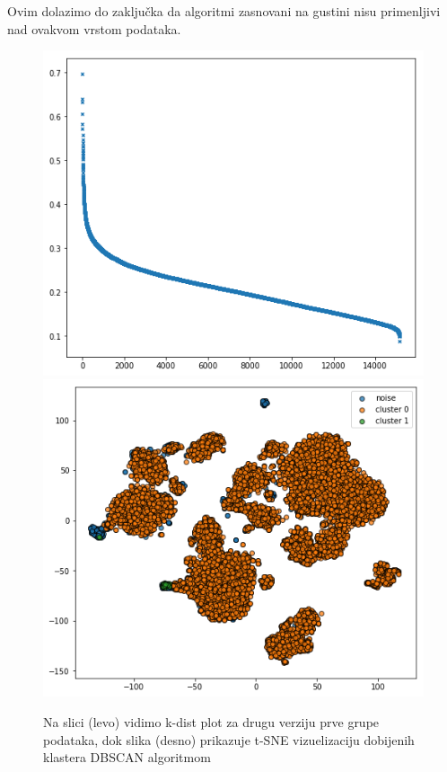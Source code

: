 \documentclass[a4paper]{article}
\begin{document}
Ovim dolazimo do zaključka da algoritmi zasnovani na gustini nisu primenljivi nad ovakvom vrstom podataka.


\begin{figure}[ht]
	\centering
	\includegraphics[scale=0.3]{kdist_v2}
	\includegraphics[scale=0.3]{dbscan_v2}
	\caption{Na slici (levo) vidimo k-dist plot za drugu verziju prve grupe podataka, dok slika (desno) prikazuje t-SNE vizuelizaciju dobijenih klastera DBSCAN algoritmom}
	\label{dbscan_v2}
\end{figure}
\end{document}
